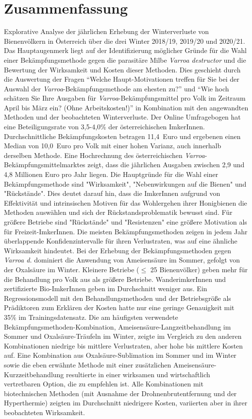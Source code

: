\chapter*{Zusammenfassung}
\label{sec:Zusammenfassung}
\vspace*{-15mm}

Explorative Analyse der jährlichen Erhebung der Winterverluste von Bienenvölkern in Österreich über die drei Winter 2018/19, 2019/20 und 2020/21. Das Hauptaugenmerk liegt auf der Identifizierung möglicher Gründe für die Wahl einer Bekämpfungsmethode gegen die parasitäre Milbe \textit{Varroa destructor} und die Bewertung der Wirksamkeit und Kosten dieser Methoden. Dies geschieht durch die Auswertung der Fragen \enquote{Welche Haupt-Motivationen treffen für Sie bei der Auswahl der \textit{Varroa}-Bekämpfungsmethode am ehesten zu?} und \enquote{Wie hoch schätzen Sie Ihre Ausgaben für \textit{Varroa}-Bekämpfungsmittel pro Volk im Zeitraum April bis März ein? (Ohne Arbeitskosten!)} in Kombination mit den angewandten Methoden und der beobachteten Winterverluste. Der Online Umfragebogen hat eine Beteiligungsrate von 3,5-4,0\% der österreichischen ImkerInnen. Durchschnittliche Bekämpfungskosten betragen 11,4~Euro und ergebenen einen Median von 10,0~Euro pro Volk mit einer hohen Varianz, auch innerhalb derselben Methode. Eine Hochrechnung des österreichischen \textit{Varroa}-Bekämpfungsmittelmarktes zeigt, dass die jährlichen Ausgaben zwischen 2,9 und 4,8 Millionen Euro pro Jahr liegen. Die Hauptgründe für die Wahl einer Bekämpfungsmethode sind "Wirksamkeit", "Nebenwirkungen auf die Bienen" und "Rückstände". Dies deutet darauf hin, dass die ImkerInnen aufgrund von Effektivität und intrinsischen Motiven für das Wohlergehen ihrer Honigbienen die Methoden auswählen und sich der Rückstandsproblematik bewusst sind. Für größere Betriebe sind "Rückstände" und "Resistenzen" eine größere Motivation als für Freizeit-ImkerInnen. Die meisten Bekämpfungsmethoden zeigen in jedem Jahr überlappende Konfidenzintervalle für ihren Verlustraten, was auf eine ähnliche Wirksamkeit hindeutet. Bei der Erhebung der Bekämpfungsmethoden gegen \textit{Varroa d.} dominiert die Anwendung von Ameisensäure im Sommer, gefolgt von der Oxalsäure im Winter. Kleinere Betriebe ($\leq$ 25 Bienenvölker) geben mehr für die Behandlung pro Volk aus als größere Betriebe. WanderimkerInnen und zertifizierte Bio-ImkerInnen geben im Durchschnitt weniger aus. Ein Regressionsmodell mit den Behandlungsmethoden und der Betriebsgröße als Prädiktoren zum Erklären der Kosten hatte nur eine geringe Genauigkeit mit 35\% im Trainingsdatensatz. Die am häufigsten verwendete Bekämpfungsmethoden-Kombination, Ameisensäure-Langzeitbehandlung im Sommer und Oxalsäure-Träufeln im Winter, zeigte im Vergleich zu den anderen Kombinationen niedrige bis mittlere Verlustraten, aber hohe bis mittlere Kosten auf. Eine Kombination aus Oxalsäure-Sublimation im Sommer und im Winter sowie die eben erwähnte Methode mit einer zusätzlichen Ameisensäure-Kurzzeitbehandlung resultierte in einer wirksamen und wirtschaftlich vertretbaren Option, die zu empfehlen ist. Alle Kombinationen mit biotechnischen Methoden (mit Ausnahme der Drohnenbrutentfernung und der Hyperthermie) zeigten im Durchschnitt niedrigere Kosten, variierten aber in ihrer beobachteten Wirksamkeit.
